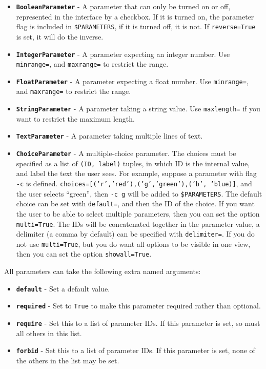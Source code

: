 \documentclass[a4paper,12pt]{report}
\begin{document}
\begin{itemize}
\item \textbf{\texttt{BooleanParameter}} - A parameter that can only be turned on or off, represented in the interface by a checkbox. If it is turned on, the parameter flag is included in \texttt{\$PARAMETERS}, if it is turned off, it is not. If \texttt{reverse=True} is set, it will do the inverse.
\item \textbf{\texttt{IntegerParameter}} - A parameter expecting an integer number. Use \texttt{minrange=}, and \texttt{maxrange=} to restrict the range.
\item \textbf{\texttt{FloatParameter}} - A parameter expecting a float number. Use \texttt{minrange=}, and \texttt{maxrange=} to restrict the range.
\item \textbf{\texttt{StringParameter}} - A parameter taking a string value. Use \texttt{maxlength=} if you want to restrict the maximum length.
\item \textbf{\texttt{TextParameter}} - A parameter taking multiple lines of text. 
\item \textbf{\texttt{ChoiceParameter}} - A multiple-choice parameter. The choices must be specified as a list of \texttt{(ID, label)} tuples, in which ID is the internal value, and label the text the user sees. For example, suppose a parameter with flag \texttt{-c} is defined.  \texttt{choices=[('r','red'),('g','green'),('b', 'blue)]}, and the user selects ``green'', then  \texttt{-c g} will be added to \texttt{\$PARAMETERS}. The default choice can be set with \texttt{default=}, and then the ID of the choice. If you want the user to be able to select multiple parameters, then you can set the option \texttt{multi=True}. The IDs will be concatenated together in the parameter value, a delimiter (a comma by default) can be specified with \texttt{delimiter=}. If you do not use \texttt{multi=True}, but you do want all options to be visible in one view, then you can set the option \texttt{showall=True}.
\end{itemize}

All parameters can take the following extra named arguments:

\begin{itemize}
\item \textbf{\texttt{default}} - Set a default value.
\item \textbf{\texttt{required}} - Set to \texttt{True} to make this parameter required rather than optional.
\item \textbf{\texttt{require}} - Set this to a list of parameter IDs. If this parameter is set, so must all others in this list.
\item \textbf{\texttt{forbid}} - Set this to a list of parameter IDs. If this parameter is set, none of the others in the list may be set.
\end{itemize}
\end{document}
